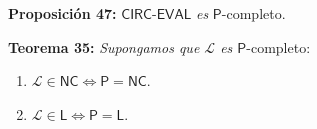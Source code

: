 \documentclass{article}
\begin{document}
\begin{flushleft}
  \textbf{Proposición 47:}
  $\mathsf{CIRC}$-$\mathsf{EVAL}$ \textit{es} $\mathsf{P}$-completo.
\end{flushleft}

\begin{flushleft}
  \textbf{Teorema 35:}
  \textit{Supongamos que $\mathcal{L}$ es $\mathsf{P}$}-completo:
\end{flushleft}
\begin{enumerate}
  \item $\mathcal{L} \in \mathsf{NC \iff P = NC}$.
  \item $\mathcal{L} \in \mathsf{L \iff P = L}$.
\end{enumerate}
\end{document}
